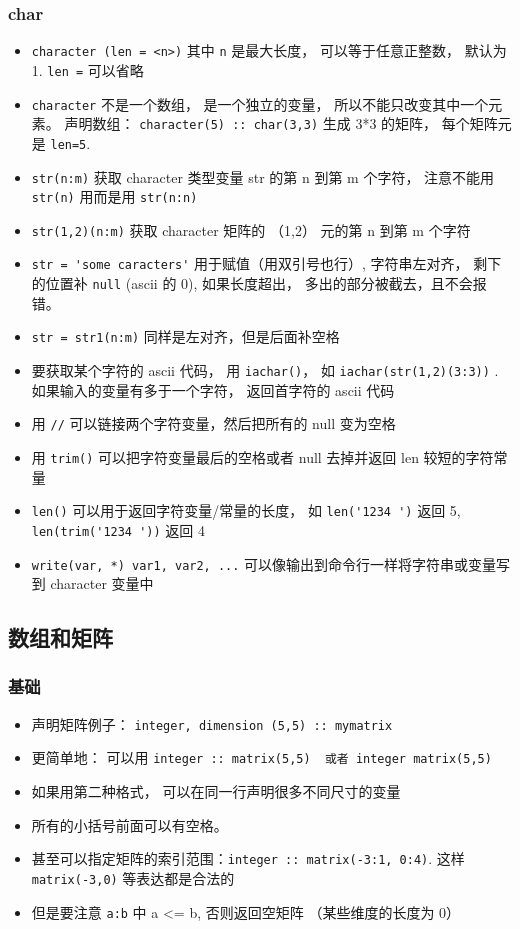 \subsubsection{char}
\begin{itemize}
\item \verb`character (len = <n>)` 其中 \verb`n` 是最大长度， 可以等于任意正整数， 默认为 1.  \verb`len =` 可以省略
\item \verb`character` 不是一个数组， 是一个独立的变量， 所以不能只改变其中一个元素。 声明数组： \verb`character(5) :: char(3,3)` 生成 3*3 的矩阵， 每个矩阵元是 \verb`len=5`.
\item \verb`str(n:m)` 获取 character 类型变量 str 的第 n 到第 m 个字符， 注意不能用 \verb`str(n)` 用而是用 \verb`str(n:n)`
\item \verb`str(1,2)(n:m)` 获取 character 矩阵的 （1,2） 元的第 n 到第 m 个字符
\item \verb`str = 'some caracters'` 用于赋值（用双引号也行）, 字符串左对齐， 剩下的位置补 \verb`null` (ascii 的 0), 如果长度超出， 多出的部分被截去，且不会报错。
\item \verb`str = str1(n:m)` 同样是左对齐，但是后面补空格
\item 要获取某个字符的 ascii 代码， 用 \verb`iachar()`， 如 \verb`iachar(str(1,2)(3:3))` . 如果输入的变量有多于一个字符， 返回首字符的 ascii 代码
\item 用 \verb`//` 可以链接两个字符变量，然后把所有的 null 变为空格
\item 用 \verb`trim()` 可以把字符变量最后的空格或者 null 去掉并返回 len 较短的字符常量
\item \verb`len()` 可以用于返回字符变量/常量的长度， 如 \verb`len('1234 ')` 返回 5, \verb`len(trim('1234 '))` 返回 4
\item \verb`write(var, *) var1, var2, ...` 可以像输出到命令行一样将字符串或变量写到 character 变量中
\end{itemize}

\subsection{数组和矩阵}
\subsubsection{基础}
\begin{itemize}
\item 声明矩阵例子：  \verb`integer, dimension (5,5) :: mymatrix`
\item 更简单地： 可以用 \verb`integer :: matrix(5,5)  或者 integer matrix(5,5)`
\item 如果用第二种格式， 可以在同一行声明很多不同尺寸的变量
\item 所有的小括号前面可以有空格。
\item 甚至可以指定矩阵的索引范围：\verb`integer :: matrix(-3:1, 0:4)`. 这样 \verb`matrix(-3,0)` 等表达都是合法的
\item 但是要注意 \verb`a:b` 中 a <= b, 否则返回空矩阵 （某些维度的长度为 0）
\end{itemize}

